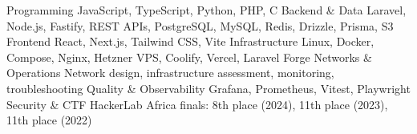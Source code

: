 
\begin{cvskills}
  \cvskill
    {Programming}
    {JavaScript, TypeScript, Python, PHP, C}
  \cvskill
    {Backend \& Data}
    {Laravel, Node.js, Fastify, REST APIs, PostgreSQL, MySQL, Redis, Drizzle, Prisma, S3}
  \cvskill
    {Frontend}
    {React, Next.js, Tailwind CSS, Vite}
  \cvskill
    {Infrastructure}
    {Linux, Docker, Compose, Nginx, Hetzner VPS, Coolify, Vercel, Laravel Forge}
  \cvskill
    {Networks \& Operations}
    {Network design, infrastructure assessment, monitoring, troubleshooting}
  \cvskill
    {Quality \& Observability}
    {Grafana, Prometheus, Vitest, Playwright}
  \cvskill
    {Security \& CTF}
    {HackerLab Africa finals: 8th place (2024), 11th place (2023), 11th place (2022)}
\end{cvskills}

